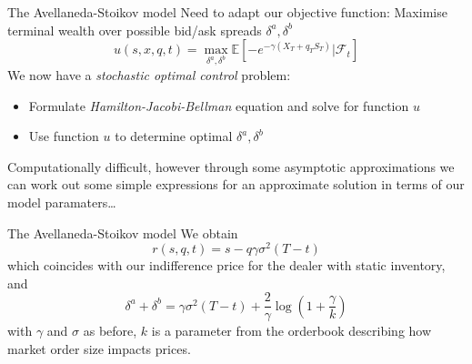 \documentclass{beamer} %
\begin{document}
\begin{frame}{The Avellaneda-Stoikov model}
    Need to adapt our objective function: Maximise terminal wealth over possible bid/ask spreads $\delta^a,\delta^b$
    \begin{equation}
        u(s,x,q,t)=\max_{\delta^a,\delta^b}\mathbb{E}\left[-e^{-\gamma(X_T+q_TS_T)}|\mathcal{F}_t\right]
    \end{equation}
    We now have a \emph{stochastic optimal control} problem:
    \begin{itemize}
        \item Formulate \emph{Hamilton-Jacobi-Bellman} equation and solve for function $u$
        \item Use function $u$ to determine optimal $\delta^a,\delta^b$
    \end{itemize}
    Computationally difficult, however through some asymptotic approximations we can 
    work out some simple expressions for an approximate solution in terms of our model paramaters\dots
\end{frame}

\begin{frame}{The Avellaneda-Stoikov model}
    We obtain
    \begin{equation}
        r(s,q,t)=s-q\gamma\sigma^2(T-t)
    \end{equation}
    which coincides with our indifference price for the dealer with static inventory, and
    \begin{equation}
        \delta^a+\delta^b=\gamma\sigma^2(T-t)+\frac{2}{\gamma}\log\left(1+\frac{\gamma}{k}\right)
    \end{equation}
    with $\gamma$ and $\sigma$ as before, $k$ is a parameter from the orderbook describing how 
    market order size impacts prices.
\end{frame}
\end{document}
